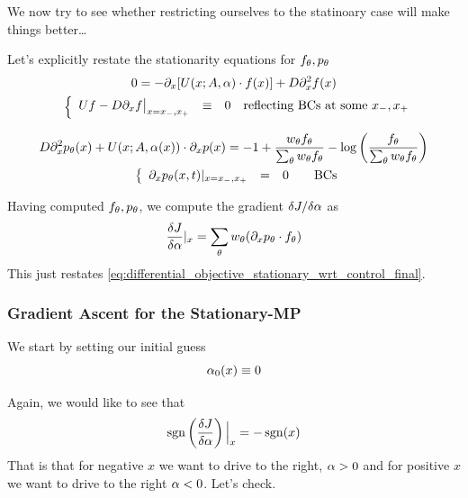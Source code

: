 \documentclass{article}
\begin{document}
We now try to see whether restricting ourselves to the statinoary case will make
things better\ldots

Let's explicitly restate the stationarity equations for ${ f_{\theta}},{ p_{\theta}}$
\begin{equation}
\begin{gathered}
0 = -{\partial}_x [ U(x;A, {\alpha}) \cdot f(x )] + D {\partial}_x^2
f(x )
\\
\begin{array}{ll}
	&
	\left\{ \begin{array}{lcll}
	U f - D {\partial}_x f \big|_{x={ x_{-} },{ x_{+} }} &\equiv& 0 & \textrm{reflecting BCs
	at some } { x_{-} }, { x_{+} } \end{array} \right.
\end{array}
\label{eq:forward_density_double_well_stationary}
\end{gathered}
\end{equation}

\begin{equation}
\begin{gathered}
D {\partial}_x^2 { p_{\theta}}(x ) +
U(x;A, {\alpha}(x ))\cdot {\partial}_x p(x ) =
- 1 + \frac{  w_{\theta} { f_{\theta}} }{\sum_{\theta} { w_{\theta} }{ f_{\theta}}} 
- \log\left(\frac{f_{\theta}} {\sum_{\theta} { w_{\theta} } { f_{\theta}} }\right)
\\
\begin{array}{ll}
	&
	\left\{ \begin{array}{lcll}
	{\partial}_x { p_{\theta}}(x, t)|_{x = { x_{-} }, { x_{+} }}  &=& 0  \quad &\textrm{BCs}
\end{array} \right.
\end{array}
\label{eq:backward_adjoint_double_well_statinoary}
\end{gathered}
\end{equation}

Having computed ${ f_{\theta}}, { p_{\theta}}$, we compute the gradient $\delta J / \delta {\alpha}$
as
$$
\frac {\delta J}{\delta {\alpha}} |_{x} = \sum_{\theta} { w_{\theta} } ({\partial}_x { p_{\theta}} \cdot { f_{\theta}})
$$
This just restates \cref{eq:differential_objective_stationary_wrt_control_final}.

\subsubsection{Gradient Ascent for the Stationary-MP}
We start by setting our initial guess $${\alpha}_0(x) \equiv 0$$ 

Again, we would like to see that 
$$ \operatorname{sgn} \left(\frac {\delta J}{\delta {\alpha}}\right) \Big|_{x} = - \operatorname{sgn}(x)$$
That is that for negative $x$ we want to drive to the right, ${\alpha} > 0$ and for
positive $x$ we want to drive to the right ${\alpha} < 0$. 
Let's check.  
\end{document}
